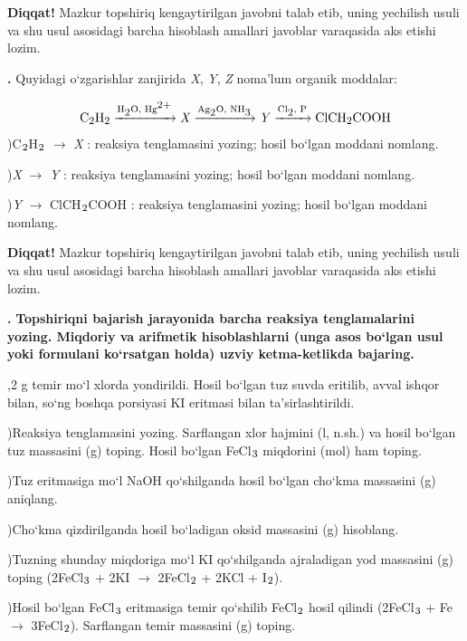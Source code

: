 \documentclass[11pt,a4paper]{article}
\renewcommand{\textsubscript}[1]{\ensuremath{_{\text{\fontsize{8}{8}\selectfont #1}}}}
\renewcommand{\textsuperscript}[1]{\ensuremath{^{\text{\fontsize{8}{8}\selectfont #1}}}}
\newcommand{\qn}[1]{\textbf{\fontsize{11.5}{13}\selectfont #1}}
\newcommand{\qsep}{\par\vspace{1pt}\noindent\rule{0pt}{0.4pt}\par\vspace{5pt}}
\newcommand{\diqqat}[1]{\par\smallskip\noindent\textbf{Diqqat!} #1\par\medskip}
\begin{document}
\diqqat{Mazkur topshiriq kengaytirilgan javobni talab etib, uning yechilish usuli va shu usul asosidagi barcha hisoblash amallari javoblar varaqasida aks etishi lozim.}\qsep
\noindent\qn{42.} Quyidagi o`zgarishlar zanjirida \textit{X}, \textit{Y}, \textit{Z} noma'lum organik moddalar:\par
\[\setlength{\fboxsep}{0pt}\text{C\textsubscript{2}H\textsubscript{2}}\xrightarrow{\text{H\textsubscript{2}O, Hg\textsuperscript{2+}}}\text{\textit{X}}\xrightarrow{\text{Ag\textsubscript{2}O, NH\textsubscript{3}}}\text{\textit{Y}}\xrightarrow{\text{Cl\textsubscript{2}, P}}\text{ClCH\textsubscript{2}COOH}\]
)C\textsubscript{2}H\textsubscript{2} $\to$ \textit{X} : reaksiya tenglamasini yozing; hosil bo`lgan moddani nomlang.\par
{})\textit{X} $\to$ \textit{Y} : reaksiya tenglamasini yozing; hosil bo`lgan moddani nomlang.\par
{})\textit{Y} $\to$ ClCH\textsubscript{2}COOH : reaksiya tenglamasini yozing; hosil bo`lgan moddani nomlang.\par
\diqqat{Mazkur topshiriq kengaytirilgan javobni talab etib, uning yechilish usuli va shu usul asosidagi barcha hisoblash amallari javoblar varaqasida aks etishi lozim.}\qsep
\noindent\qn{43.} \textbf{Topshiriqni bajarish jarayonida barcha reaksiya tenglamalarini yozing. Miqdoriy va arifmetik hisoblashlarni (unga asos bo`lgan usul yoki formulani ko`rsatgan holda) uzviy ketma-ketlikda bajaring.}\par{},2 g temir mo`l xlorda yondirildi. Hosil bo`lgan tuz suvda eritilib, avval ishqor bilan, so`ng boshqa porsiyasi KI eritmasi bilan ta'sirlashtirildi.\par
{})Reaksiya tenglamasini yozing. Sarflangan xlor hajmini (l, n.sh.) va hosil bo`lgan tuz massasini (g) toping. Hosil bo`lgan FeCl\textsubscript{3} miqdorini (mol) ham toping.\par
{})Tuz eritmasiga mo`l NaOH qo`shilganda hosil bo`lgan cho`kma massasini (g) aniqlang.\par
{})Cho`kma qizdirilganda hosil bo`ladigan oksid massasini (g) hisoblang.\par
{})Tuzning shunday miqdoriga mo`l KI qo`shilganda ajraladigan yod massasini (g) toping (2FeCl\textsubscript{3} + 2KI $\to$ 2FeCl\textsubscript{2} + 2KCl + I\textsubscript{2}).\par
{})Hosil bo`lgan FeCl\textsubscript{3} eritmasiga temir qo`shilib FeCl\textsubscript{2} hosil qilindi (2FeCl\textsubscript{3} + Fe $\to$ 3FeCl\textsubscript{2}). Sarflangan temir massasini (g) toping.\par
\end{document}
